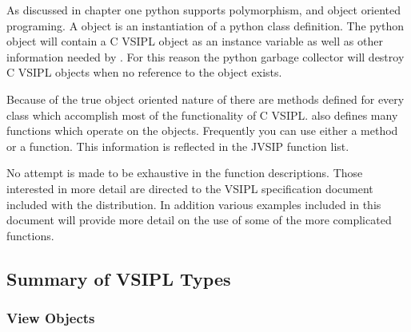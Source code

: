 As discussed in chapter one python supports polymorphism, and object oriented programing. A \pyjv object is an instantiation of a python class definition. The python object will contain a C VSIPL object as an instance variable as well as other information needed by \pyjv. For this reason the python garbage collector will destroy C VSIPL objects when no reference to the \pyjv object exists.

Because of the true object oriented nature of \pyjv there are methods defined for every class which accomplish most of the functionality of C VSIPL.  also defines many functions which operate on the \pyjv objects. Frequently you can use either a method or a function. This information is reflected in the JVSIP function list.

No attempt is made to be exhaustive in the function descriptions. Those interested in more detail are directed to the VSIPL specification document included with the \jv distribution. In addition various examples included in this document will provide more detail on the use of some of the more complicated functions.
%
   \subsection*{Summary of VSIPL Types}
   
     \subsubsection*{View Objects}

   
   
   
      
      
      
      
      
      
      
      
      
   
      
      
      
      
      
   
      
      

